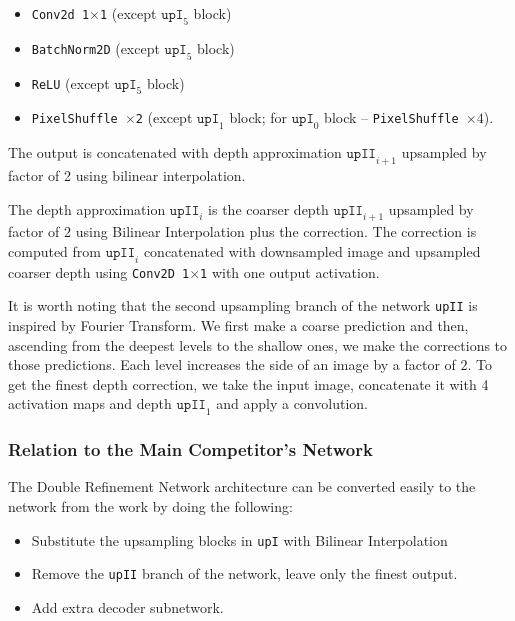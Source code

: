 \documentclass[10pt,twocolumn,letterpaper]{article}
\begin{document}
\begin{itemize}
  \item \texttt{Conv2d 1$\times$1} (except $\texttt{upI}_{5}$ block)
  \item \texttt{BatchNorm2D} (except $\texttt{upI}_{5}$ block)
  \item \texttt{ReLU} (except $\texttt{upI}_{5}$ block)
  \item \texttt{PixelShuffle $\times$2} (except $\texttt{upI}_{1}$ block; for $\texttt{upI}_{0}$ block -- \texttt{PixelShuffle $\times 4$}).
\end{itemize}

The output is concatenated  with depth approximation $\texttt{upII}_{i + 1}$ upsampled by
factor of 2 using bilinear interpolation.

The depth approximation $\texttt{upII}_{i}$ is the coarser depth
$\texttt{upII}_{i + 1}$ upsampled by factor of $2$ using Bilinear Interpolation 
plus the correction. The correction is computed from
$\texttt{upII}_{i}$ concatenated with downsampled image and upsampled coarser depth 
using \texttt{Conv2D 1$\times$1} with one output activation.

It is worth noting that the second upsampling branch of the network
\texttt{upII} is inspired by Fourier Transform. We first make a coarse
prediction and then, ascending from the deepest levels to the shallow ones,
we make the corrections to those predictions. Each level increases the side of an
image by a factor of $2$.
To get the finest depth correction, we take the input image, concatenate it
with 4 activation maps and depth $\texttt{upII}_1$ and apply a convolution. 


\subsubsection{Relation to the Main Competitor's Network}

The Double Refinement Network architecture can be converted easily to the network from
the work \cite{hu2018revisiting} by doing the following:

\begin{itemize}
    \item Substitute the upsampling blocks in \texttt{upI} with Bilinear Interpolation
    \item Remove the \texttt{upII} branch of the network, leave only the finest output.
    \item Add extra decoder subnetwork.
\end{itemize}
\end{document}
